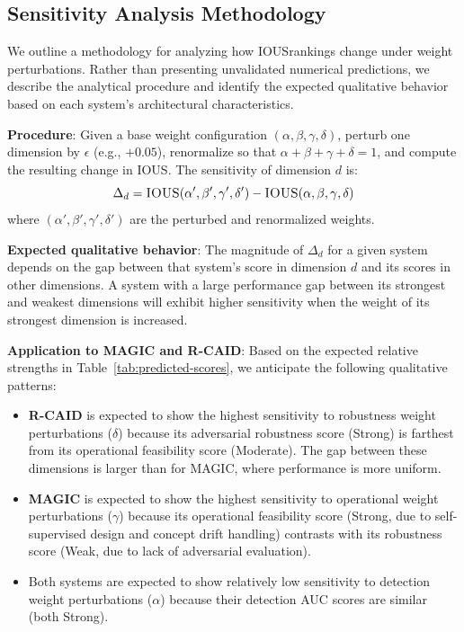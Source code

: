 \documentclass[11pt,a4paper]{article}
\newcommand{\ious}{\textsc{IOUS}}
\begin{document}
\subsection{Sensitivity Analysis Methodology}

We outline a methodology for analyzing how \ious rankings change under weight perturbations. Rather than presenting unvalidated numerical predictions, we describe the analytical procedure and identify the expected qualitative behavior based on each system's architectural characteristics.

\textbf{Procedure}: Given a base weight configuration $(\alpha, \beta, \gamma, \delta)$, perturb one dimension by $\epsilon$ (e.g., $+0.05$), renormalize so that $\alpha + \beta + \gamma + \delta = 1$, and compute the resulting change in \ious. The sensitivity of dimension $d$ is:
\begin{equation}
\Delta_d = \textsc{IOUS}(\alpha', \beta', \gamma', \delta') - \textsc{IOUS}(\alpha, \beta, \gamma, \delta)
\end{equation}
where $(\alpha', \beta', \gamma', \delta')$ are the perturbed and renormalized weights.

\textbf{Expected qualitative behavior}: The magnitude of $\Delta_d$ for a given system depends on the gap between that system's score in dimension $d$ and its scores in other dimensions. A system with a large performance gap between its strongest and weakest dimensions will exhibit higher sensitivity when the weight of its strongest dimension is increased.

\textbf{Application to MAGIC and R-CAID}: Based on the expected relative strengths in Table~\ref{tab:predicted-scores}, we anticipate the following qualitative patterns:
\begin{itemize}[leftmargin=*]
    \item \textbf{R-CAID} is expected to show the highest sensitivity to robustness weight perturbations ($\delta$) because its adversarial robustness score (Strong) is farthest from its operational feasibility score (Moderate). The gap between these dimensions is larger than for MAGIC, where performance is more uniform.
    \item \textbf{MAGIC} is expected to show the highest sensitivity to operational weight perturbations ($\gamma$) because its operational feasibility score (Strong, due to self-supervised design and concept drift handling) contrasts with its robustness score (Weak, due to lack of adversarial evaluation).
    \item Both systems are expected to show relatively low sensitivity to detection weight perturbations ($\alpha$) because their detection AUC scores are similar (both Strong).
\end{itemize}
\end{document}
